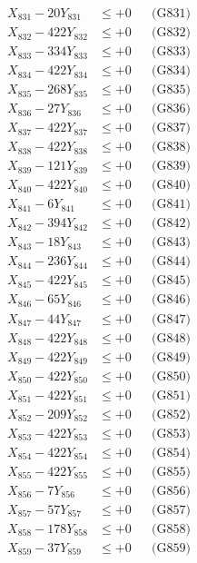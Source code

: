\documentclass[a4paper,10pt]{article}
\begin{document}
{\begin{align}
\allowbreak
X_{831} - 20Y_{831} &\leq +0 && \text{(G831)} \\
X_{832} - 422Y_{832} &\leq +0 && \text{(G832)} \\
X_{833} - 334Y_{833} &\leq +0 && \text{(G833)} \\
X_{834} - 422Y_{834} &\leq +0 && \text{(G834)} \\
X_{835} - 268Y_{835} &\leq +0 && \text{(G835)} \\
X_{836} - 27Y_{836} &\leq +0 && \text{(G836)} \\
X_{837} - 422Y_{837} &\leq +0 && \text{(G837)} \\
X_{838} - 422Y_{838} &\leq +0 && \text{(G838)} \\
X_{839} - 121Y_{839} &\leq +0 && \text{(G839)} \\
X_{840} - 422Y_{840} &\leq +0 && \text{(G840)} \\
\allowbreak
X_{841} - 6Y_{841} &\leq +0 && \text{(G841)} \\
X_{842} - 394Y_{842} &\leq +0 && \text{(G842)} \\
X_{843} - 18Y_{843} &\leq +0 && \text{(G843)} \\
X_{844} - 236Y_{844} &\leq +0 && \text{(G844)} \\
X_{845} - 422Y_{845} &\leq +0 && \text{(G845)} \\
X_{846} - 65Y_{846} &\leq +0 && \text{(G846)} \\
X_{847} - 44Y_{847} &\leq +0 && \text{(G847)} \\
X_{848} - 422Y_{848} &\leq +0 && \text{(G848)} \\
X_{849} - 422Y_{849} &\leq +0 && \text{(G849)} \\
X_{850} - 422Y_{850} &\leq +0 && \text{(G850)} \\
\allowbreak
X_{851} - 422Y_{851} &\leq +0 && \text{(G851)} \\
X_{852} - 209Y_{852} &\leq +0 && \text{(G852)} \\
X_{853} - 422Y_{853} &\leq +0 && \text{(G853)} \\
X_{854} - 422Y_{854} &\leq +0 && \text{(G854)} \\
X_{855} - 422Y_{855} &\leq +0 && \text{(G855)} \\
X_{856} - 7Y_{856} &\leq +0 && \text{(G856)} \\
X_{857} - 57Y_{857} &\leq +0 && \text{(G857)} \\
X_{858} - 178Y_{858} &\leq +0 && \text{(G858)} \\
X_{859} - 37Y_{859} &\leq +0 && \text{(G859)} \\

\end{align}}
\end{document}
